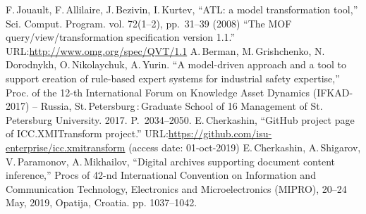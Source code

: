 \documentclass[conference]{IEEEtran} \IEEEoverridecommandlockouts
\begin{document}
\begin{thebibliography}{99}
 F.\,Jouault, F.\,Allilaire, J.\,Bezivin, I.\,Kurtev, ``ATL: a model transformation tool,'' Sci. Comput. Program. vol. 72(1--2), pp.~31--39 (2008)  ``The MOF query/view/transformation specification version 1.1.'' URL:\url{http://www.omg.org/spec/QVT/1.1}  A.\,Berman, M.\,Grishchenko, N.\,Dorodnykh, O.\,Nikolaychuk, A.\,Yurin. ``A model-driven approach and a tool to support creation of rule-based expert systems for industrial safety expertise,'' Proc. of the 12-th International Forum on Knowledge Asset Dynamics (IFKAD-2017) -- Russia, St.\,Petersburg\,:\,Graduate School of 16 Management of St.\,Petersburg University. 2017. P.~2034--2050.  E.\,Cherkashin, ``GitHub project page of ICC.XMITransform project.'' URL:\url{https://github.com/isu-enterprise/icc.xmitransform} (access date: 01-oct-2019)  E.\,Cherkashin, A.\,Shigarov, V.\,Paramonov, A.\,Mikhailov, ``Digital archives supporting document content inference,'' Procs of 42-nd International Convention on Information and Communication Technology, Electronics and Microelectronics (MIPRO), 20--24 May, 2019, Opatija, Croatia. pp. 1037--1042.


\end{thebibliography}
\end{document}
